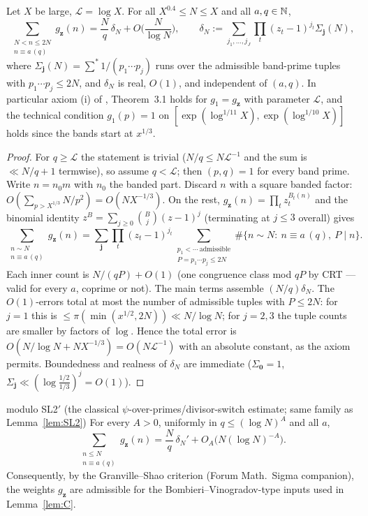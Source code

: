 \begin{lemma}\label{lem:B0}
\statusP\quad
Let $X$ be large, $\mathcal L=\log X$. For all $X^{0.4}\le N\le X$ and
all $a,q\in\mathbb{N}$,
\[
\sum_{\substack{N<n\le2N\\ n\equiv a\,(q)}}g_{\mathbf z}(n)
=\frac Nq\,\delta_N+O\Big(\frac{N}{\log N}\Big),
\qquad
\delta_N:=\sum_{j_1,\ldots,j_J}\prod_t(z_t-1)^{j_t}
\Sigma_{\mathbf j}(N),
\]
where $\Sigma_{\mathbf j}(N)=\sum^{*}1/(p_1\cdots p_{j})$ runs over the
admissible band-prime tuples with $p_1\cdots p_j\le2N$, and $\delta_N$
is real, $O(1)$, and independent of $(a,q)$. In particular
axiom (i) of \cite{TT25}, Theorem~3.1 holds for $g_1=g_{\mathbf z}$
with parameter $\mathcal L$, and the technical condition
$g_1(p)=1$ on $[\exp(\log^{1/11}X),\exp(\log^{1/10}X)]$ holds since the
bands start at $x^{1/3}$.
\end{lemma}

\begin{proof}
For $q\ge\mathcal L$ the statement is trivial ($N/q\le N\mathcal
L^{-1}$ and the sum is $\ll N/q+1$ termwise), so assume
$q<\mathcal L$; then $(p,q)=1$ for every band prime. Write $n=n_0m$
with $n_0$ the banded part. Discard $n$ with a square banded factor:
$O(\sum_{p>X^{1/3}}N/p^2)=O(NX^{-1/3})$. On the rest,
$g_{\mathbf z}(n)=\prod_tz_t^{B_t(n)}$ and the binomial identity
$z^{B}=\sum_{j\ge0}\binom Bj(z-1)^j$ (terminating at $j\le3$ overall)
gives
\[
\sum_{\substack{n\sim N\\ n\equiv a\,(q)}}g_{\mathbf z}(n)
=\sum_{\mathbf j}\prod_t(z_t-1)^{j_t}
\sum_{\substack{p_1<\cdots\ \mathrm{admissible}\\ P=p_1\cdots p_j\le2N}}
\#\{n\sim N:\ n\equiv a\,(q),\ P\mid n\}.
\]
Each inner count is $N/(qP)+O(1)$ (one congruence class mod $qP$ by
CRT --- valid for every $a$, coprime or not). The main terms assemble
$(N/q)\delta_N$. The $O(1)$-errors total at most the number of
admissible tuples with $P\le2N$: for $j=1$ this is
$\le\pi(\min(x^{1/2},2N))\ll N/\log N$; for $j=2,3$ the tuple counts
are smaller by factors of $\log$. Hence the total error is
$O(N/\log N+NX^{-1/3})=O(N\mathcal L^{-1})$ with an absolute constant,
as the axiom permits. Boundedness and realness of $\delta_N$ are
immediate ($\Sigma_{\mathbf 0}=1$, $\Sigma_{\mathbf j}\ll(\log\tfrac
{1/2}{1/3})^{j}=O(1)$).
\end{proof}

\begin{lemma}\label{lem:SW}
\statusP{} modulo SL2$'$ (the classical
$\psi$-over-primes/divisor-switch estimate; same family as
Lemma~\ref{lem:SL2})\quad
For every $A>0$, uniformly in $q\le(\log N)^{A}$ and all $a$,
\[
\sum_{\substack{n\le N\\ n\equiv a\,(q)}}g_{\mathbf z}(n)
=\frac Nq\,\delta_N'+O_A\big(N(\log N)^{-A}\big).
\]
Consequently, by the Granville--Shao criterion \cite{GS} (Forum Math.\
Sigma companion), the weights $g_{\mathbf z}$ are admissible for the
Bombieri--Vinogradov-type inputs used in Lemma~\ref{lem:C}.
\end{lemma}

